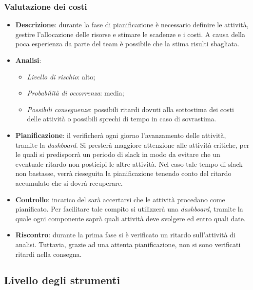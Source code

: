 		\subsubsection{Valutazione dei costi}
			\begin{itemize}
				\item \textbf{Descrizione}: durante la fase di pianificazione è necessario definire le attività, gestire l'allocazione delle risorse e stimare le scadenze e i costi. A causa della poca esperienza da parte del team è possibile che la stima risulti sbagliata.
				\item \textbf{Analisi}:
				\begin{itemize}
					\item \textit{Livello di rischio}: alto;
					\item \textit{Probabilità di occorrenza}: media;
					\item \textit{Possibili conseguenze}: possibili ritardi dovuti alla sottostima dei costi delle attività o possibili sprechi di tempo in caso di sovrastima. 
				\end{itemize}
				\item \textbf{Pianificazione}: il  verificherà ogni giorno l'avanzamento delle attività, tramite la \textit{dashboard}. Si presterà maggiore attenzione alle attività critiche, per le quali si predisporrà un periodo di slack in modo da evitare che un eventuale ritardo non posticipi le altre attività. Nel caso tale tempo di slack non bastasse, verrà rieseguita la pianificazione tenendo conto del ritardo accumulato che si dovrà recuperare.
				\item \textbf{Controllo}: incarico del  sarà accertarsi che le attività procedano come pianificato. Per facilitare tale compito si utilizzerà una \textit{dashboard}, tramite la quale ogni componente saprà quali attività deve svolgere ed entro quali date.
				\item \textbf{Riscontro}: durante la prima fase si è verificato un ritardo sull'attività di analisi. Tuttavia, grazie ad una attenta pianificazione, non si sono verificati ritardi nella consegna. 
			\end{itemize}
	\subsection{Livello degli strumenti}
